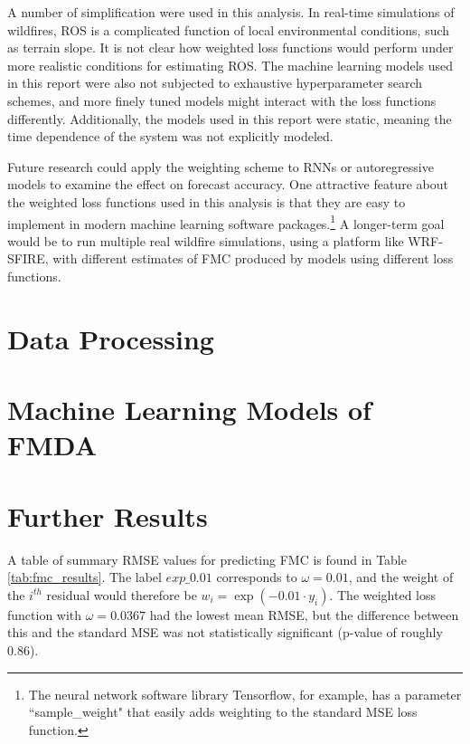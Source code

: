 \documentclass[11pt]{article}%
\begin{document}
A number of simplification were used in this analysis. In real-time simulations of wildfires, ROS is a complicated function of local environmental conditions, such as terrain slope. It is not clear how weighted loss functions would perform under more realistic conditions for estimating ROS. The machine learning models used in this report were also not subjected to exhaustive hyperparameter search schemes, and more finely tuned models might interact with the loss functions differently. Additionally, the models used in this report were static, meaning the time dependence of the system was not explicitly modeled. 

Future research could apply the weighting scheme to RNNs or autoregressive models to examine the effect on forecast accuracy. One attractive feature about the weighted loss functions used in this analysis is that they are easy to implement in modern machine learning software packages.\footnote{The neural network software library Tensorflow, for example, has a parameter ``sample\_weight" that easily adds weighting to the standard MSE loss function.} A longer-term goal would be to run multiple real wildfire simulations, using a platform like WRF-SFIRE, with different estimates of FMC produced by models using different loss functions.


\newpage




\appendix
\section{Data Processing} 
\label{app:data}

\section{Machine Learning Models of FMDA} 
\label{app:ml}


\section{Further Results}
\label{app:res}

A table of summary RMSE values for predicting FMC is found in Table \ref{tab:fmc_results}. The label $exp\_0.01$ corresponds to $\omega=0.01$, and the weight of the $i^{th}$ residual would therefore be $w_i = \exp(-0.01\cdot y_i)$. The weighted loss function with $\omega=0.0367$ had the lowest mean RMSE, but the difference between this and the standard MSE was not statistically significant (p-value of roughly 0.86).
\end{document}
